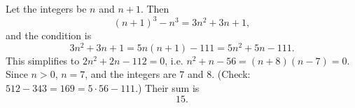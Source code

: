 Let the integers be $n$ and $n+1$. Then
\[(n+1)^3-n^3=3n^2+3n+1,\]
and the condition is
\[3n^2+3n+1=5n(n+1)-111=5n^2+5n-111.\]
This simplifies to $2n^2+2n-112=0$, i.e. $n^2+n-56=(n+8)(n-7)=0$. Since $n>0$, $n=7$, and the integers are $7$ and $8$. (Check: $512-343=169=5\cdot56-111$.) Their sum is
\[\boxed{15}.\]
